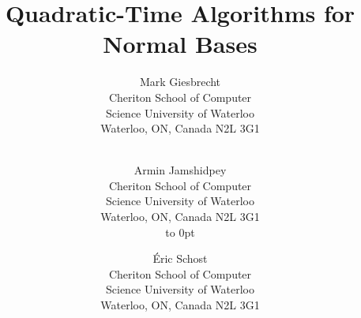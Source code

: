 
\documentclass[noprefixes]{cc}



\usepackage{bbm}

\contact{}%
\submitted{}%
\title{Quadratic-Time Algorithms for Normal Bases}%
\titlehead{Normal Bases}%
\author{
Mark Giesbrecht \\
Cheriton School of Computer\\ Science
University of Waterloo\\ 
Waterloo, ON, Canada  N2L 3G1 \\
\\
\and 
Armin Jamshidpey\\
Cheriton School of Computer\\ Science
University of Waterloo\\ 
Waterloo, ON, Canada  N2L 3G1 \\
\hbox to 0pt{}\\
\and 
\'Eric Schost \\
Cheriton School of Computer\\ Science
University of Waterloo\\ 
Waterloo, ON, Canada  N2L 3G1 \\
\\
\\
}
